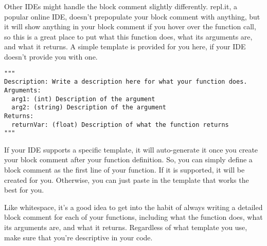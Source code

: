 Other IDEs might handle the block comment slightly differently. repl.it, a popular online IDE, doesn't prepopulate your block comment with anything, but it will show anything in your block comment if you hover over the function call, so this is a great place to put what this function does, what its arguments are, and what it returns. A simple template is provided for you here, if your IDE doesn't provide you with one.\par
\begin{lstlisting}[style=pippython]
"""
Description: Write a description here for what your function does.
Arguments:
  arg1: (int) Description of the argument
  arg2: (string) Description of the argument
Returns:
  returnVar: (float) Description of what the function returns
"""
\end{lstlisting}
If your IDE supports a specific template, it will auto-generate it once you create your block comment after your function definition. So, you can simply define a block comment as the first line of your function. If it is supported, it will be created for you. Otherwise, you can just paste in the template that works the best for you.\par
Like whitespace, it's a good idea to get into the habit of always writing a detailed block comment for each of your functions, including what the function does, what its arguments are, and what it returns. Regardless of what template you use, make sure that you're descriptive in your code.\par
